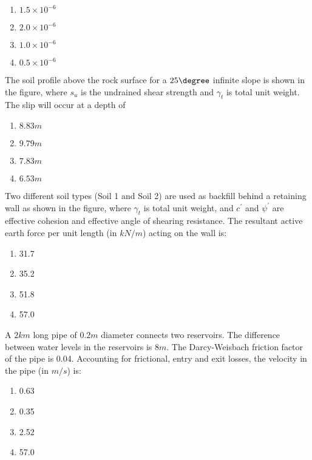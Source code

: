     		
    		
		\begin{enumerate}
			\item $1.5 \times 10^{-6}$
			\item $2.0 \times 10^{-6}$
			\item $1.0 \times 10^{-6}$
			\item $0.5 \times 10^{-6}$
		\end{enumerate}

	\item
	The soil profile above the rock surface for a $25 \degree$ infinite slope is shown in the figure, where $s_u$ is the undrained shear strength and $\gamma_{t}$ is total unit weight. The slip will occur at a depth of
	
    		
    		
		\begin{enumerate}
			\item $8.83 m$
			\item $9.79 m$
			\item $7.83 m$
			\item $6.53 m$
		\end{enumerate}
	\item
	Two different soil types (Soil 1 and Soil 2) are used as backfill behind a retaining wall as shown in the figure, where $\gamma_{t}$ is total unit weight, and $c^{\prime}$ and $\psi^{\prime}$ are effective cohesion and effective angle of shearing resistance. The resultant active earth force per unit length (in $kN/m$) acting on the wall is:
	
    		
    		
		\begin{enumerate}
			\item 31.7
			\item 35.2
			\item 51.8
			\item 57.0
		\end{enumerate}
	\item
	A $2 km$ long pipe of $0.2 m$ diameter connects two reservoirs. The difference between water levels in the reservoirs is $8 m$. The Darcy-Weisbach friction factor of the pipe is 0.04. Accounting for frictional, entry and exit losses, the velocity in the pipe (in $m/s$) is:
		\begin{enumerate}
			\item 0.63
			\item 0.35
			\item 2.52
			\item 57.0
		\end{enumerate}
		
